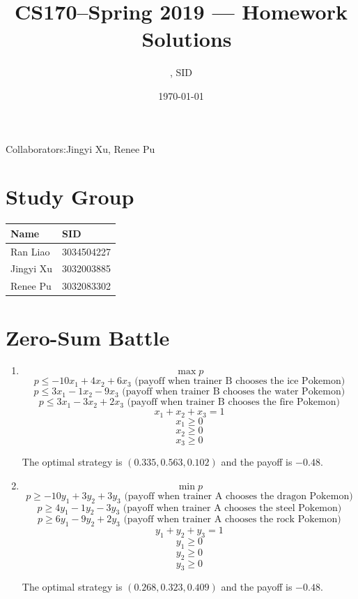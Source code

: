 \documentclass[11pt]{article}
\title{CS170--Spring 2019 --- Homework \Homework\ Solutions}
\author{\Name, SID \SID}
\date{\today}
\newenvironment{qparts}{\begin{enumerate}[{(}a{)}]}{\end{enumerate}}
\begin{document}
\maketitle
Collaborators:Jingyi Xu, Renee Pu

\section{Study Group}
	\begin{tabular}{ll}
		Name		&   SID         		\\\hline
		Ran Liao		&   3034504227  	\\  
		Jingyi Xu		&   3032003885  	\\
		Renee Pu		&   3032083302  	\\
	\end{tabular}

	



\newpage
\section{Zero-Sum Battle}
\begin{qparts}
	
	\item 
	
	\[
		\max p
	\]
	\[
		p \le -10x_1 +4x_2 + 6x_3 \text{ (payoff when trainer B chooses the ice Pokemon)}
	\]
	\[
		p \le 3x_1 -1x_2 - 9x_3 \text{ (payoff when trainer B chooses the water Pokemon)}
	\]
	\[
		p \le 3x_1 -3x_2 + 2x_3 \text{ (payoff when trainer B chooses the fire Pokemon)}
	\]
	\[
		x_1 + x_2 + x_3 = 1
	\]
	\[
		x_1 \ge 0
	\]
	\[
		x_2 \ge 0
	\]
	\[
		x_3 \ge 0
	\]
	
	The optimal strategy is $(0.335, 0.563, 0.102)$ and the payoff is $-0.48$.
		
	\item 
	
	\[
		\min p
	\]
	\[
		p \ge -10y_1 + 3y_2 + 3y_3 \text{ (payoff when trainer A chooses the dragon Pokemon)}
	\]
	\[
		p \ge 4y_1 -1y_2 - 3y_3 \text{ (payoff when trainer A chooses the steel Pokemon)}
	\]
	\[
		p \ge 6y_1 -9y_2 + 2y_3 \text{ (payoff when trainer A chooses the rock Pokemon)}
	\]
	\[
		y_1 + y_2 + y_3 = 1
	\]
	\[
		y_1 \ge 0
	\]
	\[
		y_2 \ge 0
	\]
	\[
		y_3 \ge 0
	\]
	
	The optimal strategy is $(0.268, 0.323, 0.409)$ and the payoff is $-0.48$.

\end{qparts}
\end{document}
